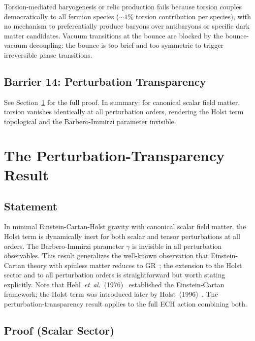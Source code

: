 \documentclass[aps,prd,twocolumn,superscriptaddress,showpacs,preprintnumbers,nofootinbib,longbibliography,floatfix]{revtex4-2}
\newcommand{\etal}{\textit{et~al.}}
\begin{document}
Torsion-mediated baryogenesis or relic production fails because torsion couples democratically to all fermion species ($\sim 1\%$ torsion contribution per species), with no mechanism to preferentially produce baryons over antibaryons or specific dark matter candidates. Vacuum transitions at the bounce are blocked by the bounce-vacuum decoupling: the bounce is too brief and too symmetric to trigger irreversible phase transitions.

\subsection{Barrier 14: Perturbation Transparency}

See Section~\ref{sec:transparency} for the full proof. In summary: for canonical scalar field matter, torsion vanishes identically at all perturbation orders, rendering the Holst term topological and the Barbero-Immirzi parameter invisible.


\section{The Perturbation-Transparency Result}\label{sec:transparency}

\subsection{Statement}

In minimal Einstein-Cartan-Holst gravity with canonical scalar field matter, the Holst term is dynamically inert for both scalar and tensor perturbations at all orders. The Barbero-Immirzi parameter $\gamma$ is invisible in all perturbation observables. This result generalizes the well-known observation that Einstein-Cartan theory with spinless matter reduces to GR~\cite{Hehl1976}; the extension to the Holst sector and to all perturbation orders is straightforward but worth stating explicitly. Note that Hehl~\etal~(1976)~\cite{Hehl1976} established the Einstein-Cartan framework; the Holst term was introduced later by Holst~(1996)~\cite{Holst1996}. The perturbation-transparency result applies to the full ECH action combining both.

\subsection{Proof (Scalar Sector)}
\end{document}
